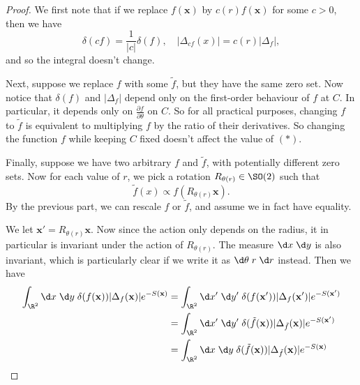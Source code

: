 \documentclass[a4paper]{article}
\begin{document}
\begin{proof}
  We first note that if we replace $f(\mathbf{x})$ by $c(r) f(\mathbf{x})$ for some $c > 0$, then we have
  \[
    \delta(cf) = \frac{1}{|c|} \delta(f),\quad |\Delta_{cf}(x)| = c(r) |\Delta_f|,
  \]
  and so the integral doesn't change.

  Next, suppose we replace $f$ with some $\tilde{f}$, but they have the same zero set. Now notice that $\delta(f)$ and $|\Delta_f|$ depend only on the first-order behaviour of $f$ at $C$. In particular, it depends only on $\frac{\partial f}{\partial \theta}$ on $C$. So for all practical purposes, changing $f$ to $\tilde{f}$ is equivalent to multiplying $f$ by the ratio of their derivatives. So changing the function $f$ while keeping $C$ fixed doesn't affect the value of $(*)$.

  Finally, suppose we have two arbitrary $f$ and $\tilde{f}$, with potentially different zero sets. Now for each value of $r$, we pick a rotation $R_{\theta(r)} \in \SO(2)$ such that
  \[
    \tilde{f}(x) \propto f(R_{\theta(r)} \mathbf{x}).
  \]
  By the previous part, we can rescale $f$ or $\tilde{f}$, and assume we in fact have equality.

  We let $\mathbf{x}' = R_{\theta(r)}\mathbf{x}$. Now since the action only depends on the radius, it in particular is invariant under the action of $R_{\theta(r)}$. The measure $\d x\;\d y$ is also invariant, which is particularly clear if we write it as $\d \theta\; r\;\d r$ instead. Then we have
  \begin{align*}
    \int_{\R^2}\d x\; \d y\; \delta(f(\mathbf{x})) |\Delta_f(\mathbf{x})| e^{-S(\mathbf{x})} &= \int_{\R^2}\d x'\; \d y'\; \delta(f(\mathbf{x}')) |\Delta_f(\mathbf{x}')| e^{-S(\mathbf{x}')}\\
    &= \int_{\R^2}\d x'\; \d y'\; \delta(\tilde{f}(\mathbf{x})) |\Delta_{\tilde{f}}(\mathbf{x})| e^{-S(\mathbf{x}')}\\
    &= \int_{\R^2}\d x\; \d y\; \delta(\tilde{f}(\mathbf{x})) |\Delta_{\tilde{f}}(\mathbf{x})| e^{-S(\mathbf{x})}
  \end{align*}
\end{proof}
\end{document}
